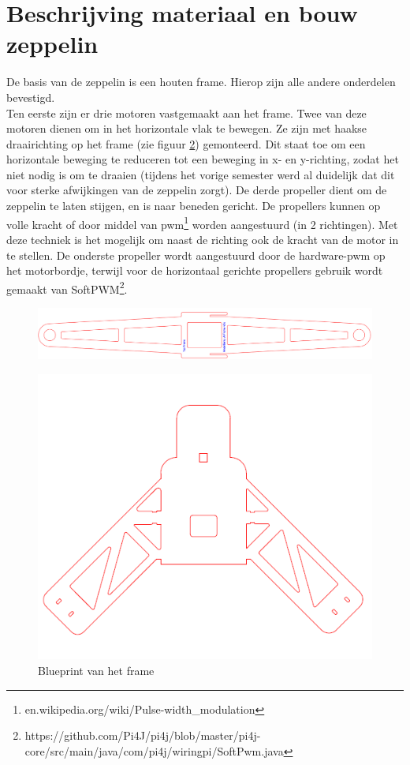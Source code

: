 \documentclass[eind]{penoverslag}
\begin{document}
\section{Beschrijving materiaal en bouw zeppelin}
De basis van de zeppelin is een houten frame. Hierop zijn alle andere onderdelen bevestigd.\\
Ten eerste zijn er drie motoren vastgemaakt aan het frame. Twee van deze motoren dienen om in het horizontale vlak te bewegen. Ze zijn met haakse draairichting op het frame (zie figuur \ref{frame}) gemonteerd. Dit staat toe om een horizontale beweging te reduceren tot een beweging in x- en y-richting, zodat het niet nodig is om te draaien (tijdens het vorige semester werd al duidelijk dat dit voor sterke afwijkingen van de zeppelin zorgt). De derde propeller dient om de zeppelin te laten stijgen, en is naar beneden gericht. De propellers kunnen op volle kracht of door middel van pwm\footnote{en.wikipedia.org/wiki/Pulse-width\_modulation} worden aangestuurd (in 2 richtingen). Met deze techniek is het mogelijk om naast de richting ook de kracht van de motor in te stellen. De onderste propeller wordt aangestuurd door de hardware-pwm op het motorbordje, terwijl voor de horizontaal gerichte propellers gebruik wordt gemaakt van SoftPWM\footnote{https://github.com/Pi4J/pi4j/blob/master/pi4j-core/src/main/java/com/pi4j/wiringpi/SoftPwm.java}. ~\\

\begin{figure}[h!]
\centering
\includegraphics[scale=0.3]{upperFrame.png}
\label{frame}
\end{figure}

\begin{figure}[h!]
\centering
\includegraphics[scale=0.4]{lowerFrame.png}
\caption{Blueprint van het frame}
\label{frame}
\end{figure}
\end{document}
